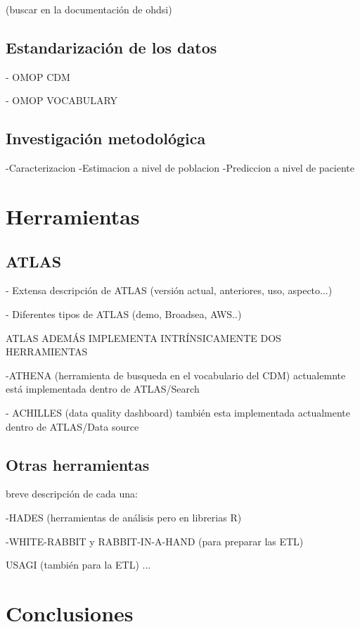 (buscar en la documentación de ohdsi)

\subsection{Estandarización de los datos}

- OMOP CDM

- OMOP VOCABULARY

\subsection{Investigación metodológica}
-Caracterizacion
-Estimacion a nivel de poblacion
-Prediccion a nivel de paciente

\section{Herramientas}
\subsection{ATLAS}

- Extensa descripción de ATLAS (versión actual, anteriores, uso, aspecto...)

- Diferentes tipos de ATLAS (demo, Broadsea, AWS..)

ATLAS ADEMÁS IMPLEMENTA INTRÍNSICAMENTE  DOS HERRAMIENTAS

-ATHENA (herramienta de busqueda en el vocabulario del CDM) actualemnte está implementada dentro de ATLAS/Search

- ACHILLES (data quality dashboard) también esta implementada actualmente dentro de ATLAS/Data source


\subsection{Otras herramientas}

breve descripción de cada una:

-HADES (herramientas de análisis pero en librerias R)

-WHITE-RABBIT y RABBIT-IN-A-HAND (para preparar las ETL)

USAGI (también para la ETL)
...

\section{Conclusiones}